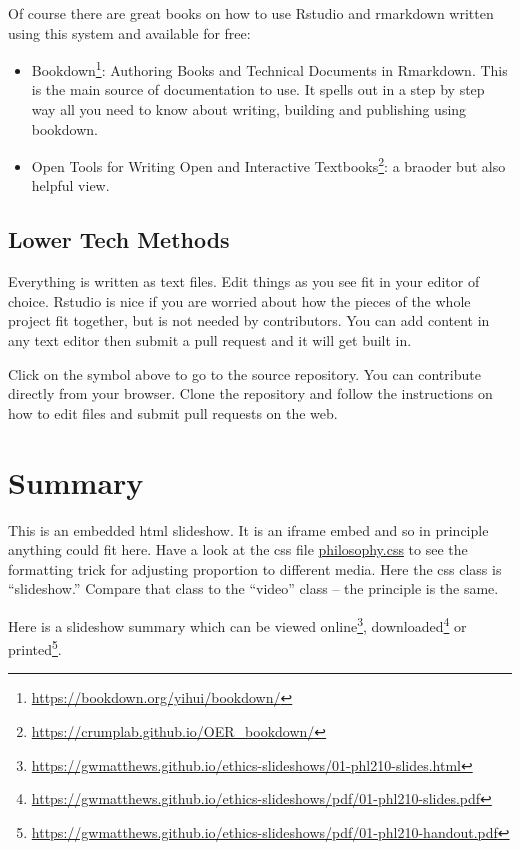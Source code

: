 \documentclass[
  12pt, openany]{book}
\makeatletter
\renewcommand{\href}[2]{#2\footnote{\url{#1}}}
\newenvironment{kframe}{%
\medskip{}
\setlength{\fboxsep}{.8em}
 \def\at@end@of@kframe{}%
 \ifinner\ifhmode%
  \def\at@end@of@kframe{\end{minipage}}%
  \begin{minipage}{\columnwidth}%
 \fi\fi%
 \def\FrameCommand##1{\hskip\@totalleftmargin \hskip-\fboxsep
 \colorbox{shadecolor}{##1}\hskip-\fboxsep
     \hskip-\linewidth \hskip-\@totalleftmargin \hskip\columnwidth}%
 \MakeFramed {\advance\hsize-\width
   \@totalleftmargin\z@ \linewidth\hsize
   \@setminipage}}%
 {\par\unskip\endMakeFramed%
 \at@end@of@kframe}
\newenvironment{rmdblock}[1]
  {
  \begin{itemize}
  \renewcommand{\labelitemi}{
    \raisebox{-.7\height}[0pt][0pt]{
      {\setkeys{Gin}{width=3em,keepaspectratio}\texttt{[image: img/\#1]}}
    }
  }
  \setlength{\fboxsep}{1em}
  \begin{kframe}
  \item
  }
  {
  \end{kframe}
  \end{itemize}
  }
\newenvironment{important}
  {\begin{rmdblock}{important}}
  {\end{rmdblock}}
\newenvironment{slideshow}{}
\makeatother
\begin{document}
Of course there are great books on how to use Rstudio and rmarkdown written using this system and available for free:

\begin{itemize}
\item
  \href{https://bookdown.org/yihui/bookdown/}{Bookdown}: Authoring Books and Technical Documents in Rmarkdown. This is the main source of documentation to use. It spells out in a step by step way all you need to know about writing, building and publishing using bookdown.
\item
  \href{https://crumplab.github.io/OER_bookdown/}{Open Tools for Writing Open and Interactive Textbooks}: a braoder but also helpful view.
\end{itemize}

\hypertarget{lower-tech-methods}{%
\subsection{Lower Tech Methods}\label{lower-tech-methods}}

Everything is written as text files. Edit things as you see fit in your editor of choice. Rstudio is nice if you are worried about how the pieces of the whole project fit together, but is not needed by contributors. You can add content in any text editor then submit a pull request and it will get built in.

\begin{important}

Click on the symbol above to go to the source repository. You can contribute directly from your browser. Clone the repository and follow the instructions on how to edit files and submit pull requests on the web.

\end{important}

\hypertarget{summary}{%
\section*{Summary}\label{summary}}


This is an embedded html slideshow. It is an iframe embed and so in principle anything could fit here. Have a look at the css file \url{philosophy.css} to see the formatting trick for adjusting proportion to different media. Here the css class is ``slideshow.'' Compare that class to the ``video'' class -- the principle is the same.

\begin{slideshow}Here is a slideshow summary which can be \href{https://gwmatthews.github.io/ethics-slideshows/01-phl210-slides.html}{viewed online}, \href{https://gwmatthews.github.io/ethics-slideshows/pdf/01-phl210-slides.pdf}{downloaded} or \href{https://gwmatthews.github.io/ethics-slideshows/pdf/01-phl210-handout.pdf}{printed}.

\end{slideshow}
\end{document}
